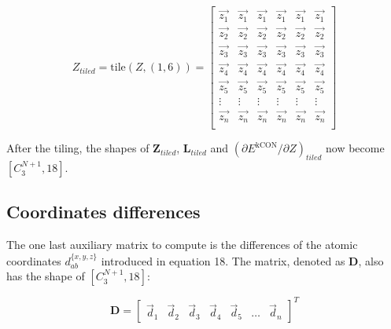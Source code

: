 \documentclass{article}
\begin{document}
\begin{equation}
Z_{tiled} = \mathrm{tile}(Z, (1,6)) = \left[
\begin{array}{cccccc}
	\vec{z_{1}} & \vec{z_{1}} & \vec{z_{1}} & \vec{z_{1}} & \vec{z_{1}} & \vec{z_{1}}  \\
	\vec{z_{2}} & \vec{z_{2}} & \vec{z_{2}} & \vec{z_{2}} & \vec{z_{2}} & \vec{z_{2}}  \\
	\vec{z_{3}} & \vec{z_{3}} & \vec{z_{3}} & \vec{z_{3}} & \vec{z_{3}} & \vec{z_{3}}  \\
	\vec{z_{4}} & \vec{z_{4}} & \vec{z_{4}} & \vec{z_{4}} & \vec{z_{4}} & \vec{z_{4}}  \\
	\vec{z_{5}} & \vec{z_{5}} & \vec{z_{5}} & \vec{z_{5}} & \vec{z_{5}} & \vec{z_{5}}  \\
	\vdots      & \vdots      & \vdots      & \vdots      & \vdots      & \vdots       \\
	\vec{z_{n}} & \vec{z_{n}} & \vec{z_{n}} & \vec{z_{n}} & \vec{z_{n}} & \vec{z_{n}}  \\
		\end{array}
	\right]
\end{equation}

\noindent After the tiling, the shapes of $\boldsymbol{Z}_{tiled}$, $\boldsymbol{L}_{tiled}$ 
and $(\partial{E^{\mathrm{kCON}}} / \partial{Z})_{tiled}$ now become $[C^{N+1}_{3}, 18]$.

\subsection{Coordinates differences}

The one last auxiliary matrix to compute is the differences of the atomic coordinates 
$d^{\{x, y, z\}}_{ab}$ introduced in equation 18. The matrix, denoted as \textbf{D}, also has 
the shape of $[C^{N+1}_{3}, 18]$:

\begin{equation}
\mathbf{D} = \left[ 
\begin{array}{ccccccc}
\vec{d}_1 & \vec{d}_2 & \vec{d}_3 & \vec{d}_4 & \vec{d}_5 & \dots & \vec{d}_n 
\end{array}
\right]^T
\end{equation}
\end{document}
